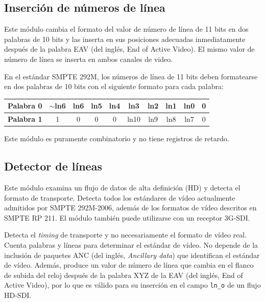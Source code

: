 \subsection{Inserción de números de línea}

Este módulo cambia el formato del valor de número de línea de 11 bits en dos
palabras de 10 bits y las inserta en sus posiciones adecuadas inmediatamente
después de la palabra EAV (del inglés, End of Active Video)\@. El mismo valor
de número de línea se inserta en ambos canales de video.

En el estándar SMPTE 292M, los números de línea de 11 bits deben formatearse en
dos palabras de 10 bits con el siguiente formato para cada palabra:

\begin{center}
  \begin{tabular}{|c|c|c|c|c|c|c|c|c|c|}
    \hline
    \textbf{Palabra 0} & $\sim$ln6 & ln6 & ln5 & ln4 & ln3 & ln2 & ln1 & ln0 & 0 \\
    \hline
    \textbf{Palabra 1} & 1 & 0 & 0 & 0 & ln10 & ln9 & ln8 & ln7 & 0 \\
    \hline
  \end{tabular}
\end{center}

Este módulo es puramente combinatorio y no tiene registros de retardo.


\subsection{Detector de líneas}

Este módulo examina un flujo de datos de alta definición (HD) y detecta el
formato de transporte. Detecta todos los estándares de vídeo actualmente
admitidos por SMPTE 292M-2006, además de los formatos de vídeo descritos en
SMPTE RP 211. El módulo también puede utilizarse con un receptor 3G-SDI\@.

Detecta el \textit{timing} de transporte y no necesariamente el formato de vídeo real.
Cuenta palabras y líneas para determinar el estándar de vídeo. No depende de la
inclusión de paquetes ANC (del inglés, \textit{Ancillary data}) que identifican el estándar de vídeo. Además, produce
un valor de número de línea que cambia en el flanco de subida del reloj después
de la palabra XYZ de la EAV (del inglés, End of Active Video), por lo que es válido para su inserción en el campo
\texttt{ln\_o} de un flujo HD-SDI\@.

